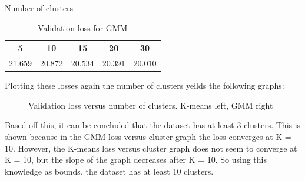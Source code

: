 \documentclass[12pt]{article}
\begin{document}
\begin{center}
  \begin{table}[h]
    \centering
    Number of clusters \\
    \begin{tabular}{||c c c c c||}
      \hline
      5 & 10 & 15 & 20 & 30 \\
      \hline \hline 
      21.659& 20.872& 20.534& 20.391& 20.010 \\
      \hline
    \end{tabular}
    \caption{Validation loss for GMM}
  \end{table}
\end{center}

Plotting these losses again the number of clusters yeilds the following graphs:

\begin{figure}[!tbp]
  \centering
  \hfill
  \caption{Validation loss versus number of clusters. K-means left, GMM right}
\end{figure}

\newpage
Based off this, it can be concluded that the dataset has at least 3 clusters. This is 
shown because in the GMM loss versus cluster graph the loss converges at K = 10. However, 
the K-means loss versus cluster graph does not seem to converge at K = 10, but the 
slope of the graph decreases after K = 10. So using this knowledge as bounds, the dataset
has at least 10 clusters.  
\end{document}
